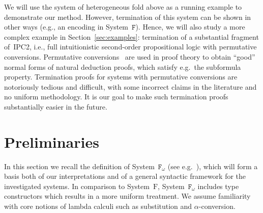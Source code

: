 \documentclass[a4paper,UKenglish,cleveref,autoref,numberwithinsect]{lipics-v2019}
\theoremstyle{definition}
\newcommand{\Fomega}{\mathtt{F}_\omega}
\newcommand{\Iterms}{\mathcal{I}}
\newcommand{\LCchange}[1]{\textcolor{red}{#1}}
\begin{document}



We will use the system of heterogeneous fold above as a running
example to demonstrate our method.  However, termination of this
system can be shown in other ways (e.g., an enco\-ding in
System~$\mathtt{F}$). Hence, we will also study a more complex example
in Section~\ref{sec:examples}: termination of a substantial fragment
of~IPC2, i.e., full intuitionistic second-order propositional logic
with permutative conversions. Permutative
conversions~\cite[Chapter~6]{TroelstraSchwichtenberg1996} are used in
proof theory to obtain ``good'' normal forms of natural deduction
proofs, which satisfy e.g.~the subformula property. Termination proofs
for systems with permutative conversions are notoriously tedious and
difficult, with some incorrect claims in the literature and no uniform
methodology. It is our goal to make such termination proofs
substantially easier in the future.


\section{Preliminaries}\label{sec_preliminaries}

In this section we recall the definition of System~$\Fomega$ (see
e.g.~\cite[Section~11.7]{SorensenUrzyczyn2006}), which will form a
basis both of our interpretations and of a general syntactic framework
for the investigated systems. In comparison to System~$\mathrm{F}$,
System~$\Fomega$ includes type constructors which results in a more
uniform treatment. We assume familiarity with core notions of lambda
calculi such as substitution and $\alpha$-conversion.
\end{document}
